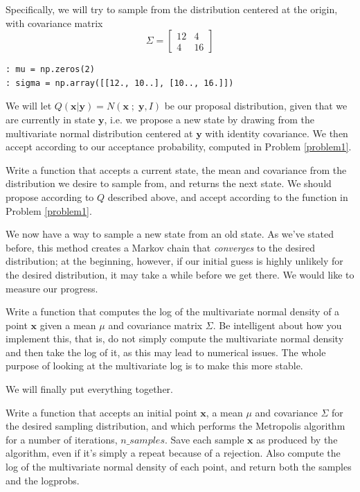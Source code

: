 Specifically, we will try to sample from the distribution centered at the origin, with covariance matrix
\begin{equation*}
\Sigma = \left[ \begin{array}{cc} 12 & 4 \\ 4 & 16 \end{array} \right]
\end{equation*}

\begin{lstlisting}
: mu = np.zeros(2)
: sigma = np.array([[12., 10..], [10.., 16.]])
\end{lstlisting}

We will let $Q(\mathbf{x} | \mathbf{y}) = N(\mathbf{x} \; ; \; \mathbf{y}, I)$ be our proposal distribution, given that we are currently in state $\mathbf{y}$, i.e. we propose a new state by drawing from the multivariate normal distribution centered at $\mathbf{y}$ with identity covariance. We then accept according to our acceptance probability, computed in Problem \ref{problem1}.

\begin{problem}
Write a function that accepts a current state, the mean and covariance from the distribution we desire to sample from, and returns the next state. We should propose according to $Q$ described above, and accept according to the function in Problem \ref{problem1}.
\end{problem}

We now have a way to sample a new state from an old state. As we've stated before, this method creates a Markov chain that \emph{converges} to the desired distribution; at the beginning, however, if our initial guess is highly unlikely for the desired distribution, it may take a while before we get there. We would like to measure our progress.

\begin{problem}
Write a function that computes the log of the multivariate normal density of a point $\mathbf{x}$ given a mean $\mu$ and covariance matrix $\Sigma$. Be intelligent about how you implement this, that is, do not simply compute the multivariate normal density and then take the log of it, as this may lead to numerical issues. The whole purpose of looking at the multivariate log is to make this more stable.
\end{problem}

We will finally put everything together.

\begin{problem}
Write a function that accepts an initial point $\mathbf{x}$, a mean $\mu$ and covariance $\Sigma$ for the desired sampling distribution, and which performs the Metropolis algorithm for a number of iterations, $n\_samples$. Save each sample $\mathbf{x}$ as produced by the algorithm, even if it's simply a repeat because of a rejection. Also compute the log of the multivariate normal density of each point, and return both the samples and the logprobs.
\end{problem}


